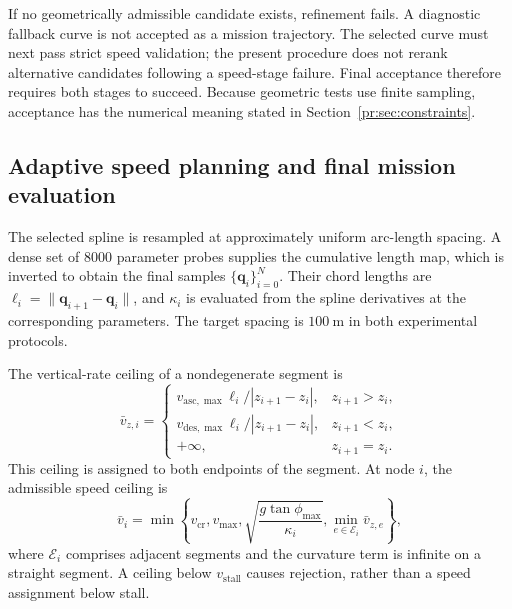 \documentclass[preprint,12pt]{elsarticle}
\begin{document}
If no geometrically admissible candidate exists, refinement fails. A
diagnostic fallback curve is not accepted as a mission trajectory. The
selected curve must next pass strict speed validation; the present
procedure does not rerank alternative candidates following a speed-stage
failure. Final acceptance therefore requires both stages to succeed.
Because geometric tests use finite sampling, acceptance has the numerical
meaning stated in Section~\ref{pr:sec:constraints}.

\subsection{Adaptive speed planning and final mission evaluation}
\label{sec:speed}

The selected spline is resampled at approximately uniform arc-length
spacing. A dense set of 8000 parameter probes supplies the cumulative
length map, which is inverted to obtain the final samples
$\{\mathbf q_i\}_{i=0}^{N}$. Their chord lengths are
$\ell_i=\|\mathbf q_{i+1}-\mathbf q_i\|$, and $\kappa_i$ is evaluated
from the spline derivatives at the corresponding parameters. The target
spacing is $100~\mathrm{m}$ in both experimental protocols.

The vertical-rate ceiling of a nondegenerate segment is
\begin{equation}
 \bar v_{z,i}=\begin{cases}
 v_{\mathrm{asc},\max}\ell_i/|z_{i+1}-z_i|,&z_{i+1}>z_i,\\
 v_{\mathrm{des},\max}\ell_i/|z_{i+1}-z_i|,&z_{i+1}<z_i,\\
 +\infty,&z_{i+1}=z_i.
 \end{cases}
 \label{me:eq:verticalcap}
\end{equation}
This ceiling is assigned to both endpoints of the segment. At node $i$,
the admissible speed ceiling is
\begin{equation}
 \bar v_i=\min\left\{
 v_{\mathrm{cr}},v_{\max},
 \sqrt{\frac{g\tan\phi_{\max}}{\kappa_i}},
 \min_{e\in\mathcal E_i}\bar v_{z,e}\right\},
 \label{me:eq:nodecap}
\end{equation}
where $\mathcal E_i$ comprises adjacent segments and the curvature term is
infinite on a straight segment. A ceiling below $v_{\mathrm{stall}}$
causes rejection, rather than a speed assignment below stall.
\end{document}
